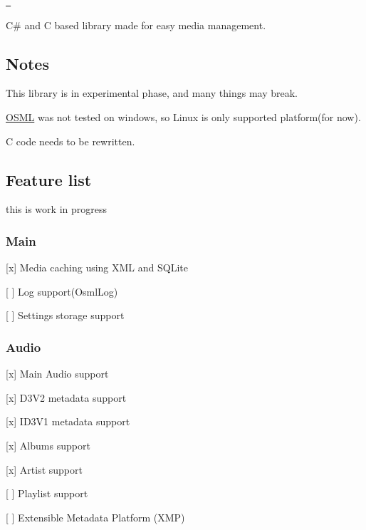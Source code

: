 \href{https://www.codefactor.io/repository/github/nullcharmander/osml}{\texttt{ }}

C\# and C based library made for easy media management.

\subsection*{Notes}


\begin{DoxyItemize}
\item This library is in experimental phase, and many things may break.
\item \mbox{\hyperlink{namespaceOSML}{O\+S\+ML}} was not tested on windows, so Linux is only supported platform(for now).
\item C code needs to be rewritten.
\end{DoxyItemize}

\subsection*{Feature list}

this is work in progress

\subsubsection*{Main}


\begin{DoxyItemize}
\item \mbox{[}x\mbox{]} Media caching using X\+ML and S\+Q\+Lite
\item \mbox{[} \mbox{]} Log support(\+Osml\+Log)
\item \mbox{[} \mbox{]} Settings storage support
\end{DoxyItemize}

\subsubsection*{Audio}


\begin{DoxyItemize}
\item \mbox{[}x\mbox{]} Main Audio support
\item \mbox{[}x\mbox{]} D3\+V2 metadata support
\item \mbox{[}x\mbox{]} I\+D3\+V1 metadata support
\item \mbox{[}x\mbox{]} Albums support
\item \mbox{[}x\mbox{]} Artist support
\item \mbox{[} \mbox{]} Playlist support
\item \mbox{[} \mbox{]} Extensible Metadata Platform (X\+MP)
\end{DoxyItemize}

